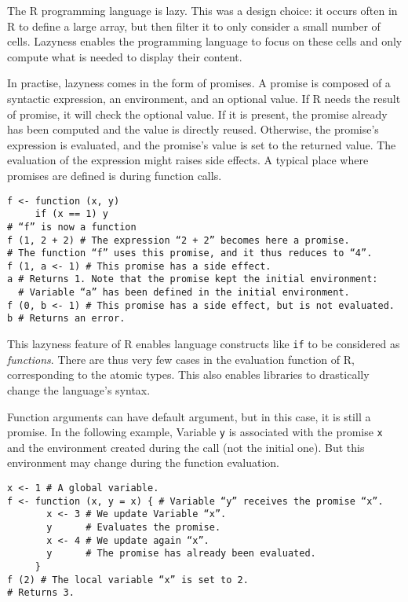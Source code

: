 \documentclass{article}
\newcommand\R{R}
\begin{document}
The \R{} programming language is lazy.
This was a design choice:
it occurs often in \R{} to define a large array,
but then filter it to only consider a small number of cells.
Lazyness enables the programming language to focus on these cells
and only compute what is needed to display their content.

In practise, lazyness comes in the form of promises.
A promise is composed of a syntactic expression,
an environment, and an optional value.
If \R{} needs the result of promise,
it will check the optional value.
If it is present, the promise already has been computed
and the value is directly reused.
Otherwise, the promise’s expression is evaluated,
and the promise’s value is set to the returned value.
The evaluation of the expression might raises side effects.
%
A typical place where promises are defined
is during function calls.
\begin{verbatim}
f <- function (x, y)
     if (x == 1) y
# “f” is now a function
f (1, 2 + 2) # The expression “2 + 2” becomes here a promise.
# The function “f” uses this promise, and it thus reduces to “4”.
f (1, a <- 1) # This promise has a side effect.
a # Returns 1. Note that the promise kept the initial environment:
  # Variable “a” has been defined in the initial environment.
f (0, b <- 1) # This promise has a side effect, but is not evaluated.
b # Returns an error.
\end{verbatim}

This lazyness feature of \R{} enables
language constructs like \texttt{if}
to be considered as \emph{functions}.
There are thus very few cases in the evaluation function
of \R{}, corresponding to the atomic types.
This also enables libraries to drastically change
the language’s syntax.

Function arguments can have default argument,
but in this case, it is still a promise.
In the following example,
Variable \texttt{y} is associated with
the promise \texttt{x} and the environment
created during the call (not the initial one).
But this environment may change during the function evaluation.
\begin{verbatim}
x <- 1 # A global variable.
f <- function (x, y = x) { # Variable “y” receives the promise “x”.
       x <- 3 # We update Variable “x”.
       y      # Evaluates the promise.
       x <- 4 # We update again “x”.
       y      # The promise has already been evaluated.
     }
f (2) # The local variable “x” is set to 2.
# Returns 3.
\end{verbatim}
\end{document}
